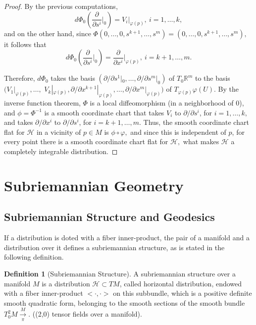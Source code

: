 \documentclass[12pt, letterpaper, reqno]{amsart}
\theoremstyle{definition}
\newtheorem{df}{Definition}
\theoremstyle{plain}
\theoremstyle{remark}
\begin{document}
\begin{proof}
	By the previous computations, $$ d\Phi_0\left( \frac{\partial}{\partial s^i}\Big|_{0} \right) = V_i |_{\varphi(p)}, \ i=1,\dots,k, $$ and on the other hand, since $ \Phi(0,\dots,0,s^{k+1},\dots,s^m)=(0,\dots,0,s^{k+1},\dots,s^m), $ it follows that
	$$ d\Phi_0 \left( \frac{\partial}{\partial s^i}\Big|_{0}  \right) = \frac{\partial}{\partial x^i}\Big|_{\varphi(p)},\ i=k+1,\dots,m.  $$ 
	
	Therefore, $ d\Phi_0 $ takes the basis $ \left( \partial/\partial s^1 |_0,\dots,\partial/\partial s^m |_0 \right) $ of $ T_0 \mathbb{R}^m $ to the basis $ ( V_1|_{\varphi(p)},  \dots,$ $ V_k|_{\varphi(p)}, \partial/\partial x^{k+1}|_{\varphi(p)}, \dots, \partial/\partial x^{m}|_{\varphi(p)}) $ of $ T_{\varphi(p)} \varphi(U). $ By the inverse function theorem, $ \Phi $ is a local diffeomorphism (in a neighborhood of $ 0 $), and $ \phi=\Phi^{-1} $ is a smooth coordinate chart that takes $ V_i $ to $ \partial/\partial s^i $, for $ i=1,\dots,k, $ and takes $ \partial / \partial x^{i} $ to $ \partial/\partial s^i $, for $ i=k+1,\dots,m. $ Thus, the smooth coordinate chart flat for $ \mathcal{H} $ in a vicinity of $ p\in M $ is $ \phi\circ\varphi, $ and since this is independent of $ p $, for every point there is a smooth coordinate chart flat for $ \mathcal{H}, $ what makes $ \mathcal{H} $ a completely integrable distribution.

\end{proof}

\section{Subriemannian Geometry}%
\label{sec:subriemannian_geometry}

\subsection{Subriemannian Structure and Geodesics}%
\label{sub:subriemannian_structure_and_geodesics}


 If a distribution is doted with a fiber inner-product, the pair of a manifold and a distribution over it defines a subriemannian structure, as is stated in the following definition.
\begin{df}[Subriemannian Structure]
	A subriemannian structure over a manifold $ M $ is a distribution $ \mathcal{H}\subset TM $, called horizontal distribution, endowed with a fiber inner-product $ <\cdot,\cdot> $ on this subbundle, which is a positive definite smooth quadratic form, belonging to the smooth sections of the smooth bundle $ T^2_0 M \xrightarrow[\pi] M. $ ((2,0) tensor fields over a manifold).
\end{df}
\end{document}
